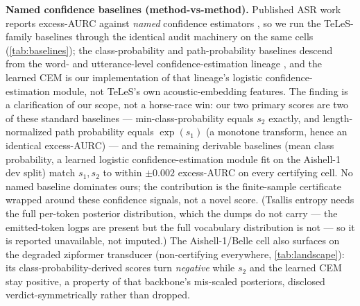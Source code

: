 \documentclass[11pt]{article}
\begin{document}
\textbf{Named confidence baselines (method-vs-method).} Published ASR work reports
excess-AURC against \emph{named} confidence estimators \citep{ravi2024teles}, so we run
the TeLeS-family baselines through the identical audit machinery on the same cells
(\cref{tab:baselines}); the class-probability and path-probability baselines descend from
the word- and utterance-level confidence-estimation lineage
\citep{qiu2021wordlevel,qiu2021deletion,swarup2019alexa}, and the learned CEM is our
implementation of that lineage's logistic confidence-estimation module, not TeLeS's own
acoustic-embedding features.
The finding is a clarification of our scope, not a horse-race win: our two primary scores
are two of these standard baselines --- min-class-probability equals $s_2$ exactly,
and length-normalized path probability equals $\exp(s_1)$ (a monotone transform, hence an
identical excess-AURC) --- and the remaining derivable baselines (mean class probability, a
learned logistic confidence-estimation module fit on the Aishell-1 dev split) match $s_1,s_2$
to within $\pm0.002$ excess-AURC on every certifying cell. No named baseline dominates ours;
the contribution is the finite-sample certificate wrapped around these confidence signals,
not a novel score. (Tsallis entropy needs the full per-token posterior distribution, which
the dumps do not carry --- the emitted-token logps are present but the full vocabulary
distribution is not --- so it is reported unavailable, not imputed.) The Aishell-1/Belle
cell also surfaces on the degraded zipformer transducer (non-certifying everywhere,
\cref{tab:landscape}): its class-probability-derived scores turn \emph{negative} while
$s_2$ and the learned CEM stay positive, a property of that backbone's mis-scaled
posteriors, disclosed verdict-symmetrically rather than dropped.
\end{document}
